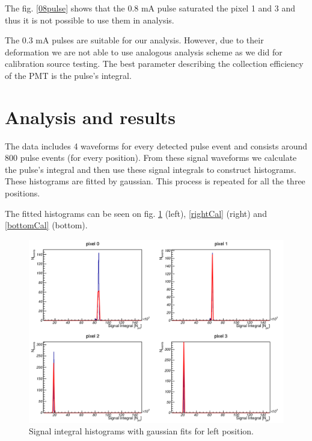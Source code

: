 The fig. \ref{08pulse} shows that the 0.8 mA pulse saturated the pixel 1 and 3 and thus it is not possible to use them in analysis. 


\par
The 0.3 mA pulses are suitable for our analysis. However, due to their deformation we are not able to use analogous analysis scheme as we did for calibration source testing. The best parameter describing the collection efficiency of the PMT is the pulse's integral. 


\section{Analysis and results}
The data includes 4 waveforms for every detected pulse event and consists around 800 pulse events (for every position). From these signal waveforms we calculate the pulse's integral and then use these signal integrals to construct histograms. These histograms are fitted by gaussian. This process is repeated for all the three positions.
\par
The fitted histograms can be seen on fig. \ref{leftCal} (left), \ref{rightCal} (right) and \ref{bottomCal} (bottom).
\begin{figure}[H]
 \centering
 \includegraphics[scale=0.32, angle = 0]{./pictures/left.png}
 \caption{Signal integral histograms with gaussian fits for left position.}
 \label{leftCal}
 
\end{figure}
